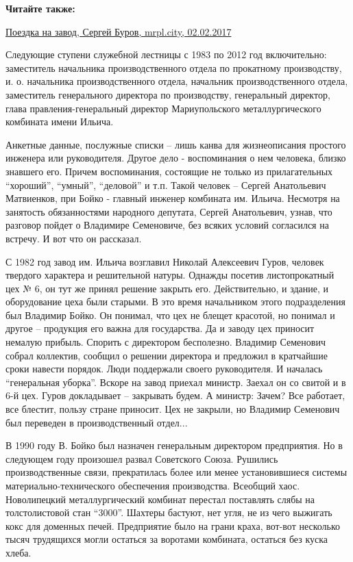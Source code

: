 \textbf{Читайте также:} 

\href{https://archive.org/details/02_02_2017.sergij_burov.mrpl_city.poezdka_na_zavod}{%
Поездка на завод, Сергей Буров, mrpl.city, 02.02.2017}

Следующие ступени служебной лестницы с 1983 по 2012 год включительно:
заместитель начальника производственного отдела по прокатному производству, и.
о. начальника производственного отдела,  начальник производственного отдела,
заместитель генерального директора по производству, генеральный директор, глава
правления-генеральный директор Мариупольского металлургического комбината имени
Ильича.

Анкетные данные, послужные списки – лишь канва для жизнеописания простого
инженера или руководителя. Другое дело - воспоминания о нем человека, близко
знавшего его. Причем воспоминания, состоящие не только из прилагательных
\enquote{хороший}, \enquote{умный}, \enquote{деловой} и т.п. Такой  человек – Сергей Анатольевич
Матвиенков, при Бойко - главный инженер комбината им. Ильича.  Несмотря на
занятость обязанностями народного депутата, Сергей Анатольевич, узнав, что
разговор пойдет о Владимире Семеновиче, без всяких условий согласился на
встречу. И вот что он рассказал.

С 1982 год завод им. Ильича возглавил Николай Алексеевич Гуров, человек
твердого характера и решительной натуры. Однажды посетив листопрокатный цех №
6, он тут же принял решение закрыть его. Действительно, и здание, и
оборудование цеха были старыми. В это время начальником этого подразделения был
Владимир Бойко. Он понимал, что цех не блещет красотой, но понимал и другое –
продукция его важна для государства. Да и заводу цех приносит немалую прибыль.
Спорить с директором бесполезно. Владимир Семенович собрал коллектив, сообщил о
решении директора и предложил в кратчайшие сроки навести порядок. Люди
поддержали своего руководителя. И началась \enquote{генеральная уборка}. Вскоре на
завод приехал министр. Заехал он со свитой и в 6-й цех. Гуров докладывает –
закрывать будем. А министр: Зачем? Все работает, все блестит, пользу стране
приносит. Цех не закрыли, но Владимир Семенович был переведен в
производственный отдел...

В 1990 году В. Бойко был назначен генеральным директором предприятия. Но в
следующем году произошел развал Советского Союза. Рушились производственные
связи, прекратилась более или менее установившиеся системы
материально-технического обеспечения производства. Всеобщий хаос. Новолипецкий
металлургический комбинат перестал поставлять слябы на толстолистовой стан
\enquote{3000}. Шахтеры бастуют, нет угля, не из чего выжигать кокс для доменных
печей. Предприятие было на грани краха, вот-вот несколько тысяч трудящихся
могли остаться за воротами комбината, остаться без куска хлеба.

